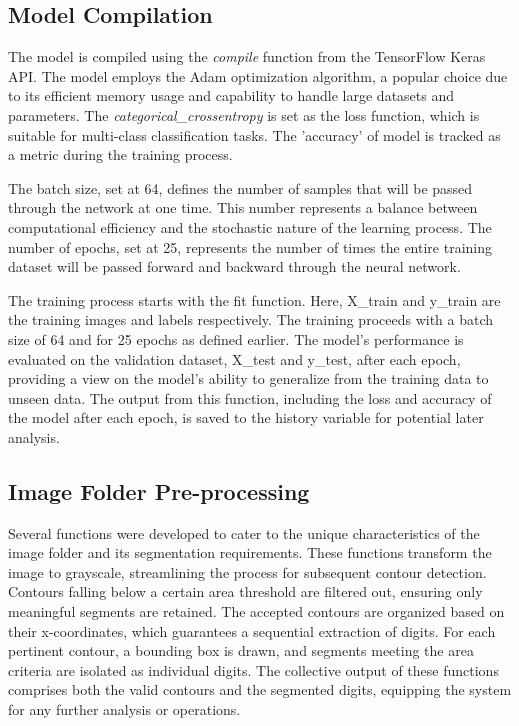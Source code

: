 \subsection{Model Compilation}
The model is compiled using the \textit{compile} function from the TensorFlow Keras API. The model employs the Adam optimization algorithm, a popular choice due to its efficient memory usage and capability to handle large datasets and parameters. The \textit{categorical\_crossentropy} is set as the loss function, which is suitable for multi-class classification tasks. The 'accuracy' of model is tracked as a metric during the training process.

The batch size, set at 64, defines the number of samples that will be passed through the network at one time. This number represents a balance between computational efficiency and the stochastic nature of the learning process. The number of epochs, set at 25, represents the number of times the entire training dataset will be passed forward and backward through the neural network.

The training process starts with the fit function. Here, X\_train and y\_train are the training images and labels respectively. The training proceeds with a batch size of 64 and for 25 epochs as defined earlier. The model's performance is evaluated on the validation dataset, X\_test and y\_test, after each epoch, providing a view on the model's ability to generalize from the training data to unseen data. The output from this function, including the loss and accuracy of the model after each epoch, is saved to the history variable for potential later analysis.

\subsection{Image Folder Pre-processing}

Several functions were developed to cater to the unique characteristics of the image folder and its segmentation requirements. These functions transform the image to grayscale, streamlining the process for subsequent contour detection. Contours falling below a certain area threshold are filtered out, ensuring only meaningful segments are retained. The accepted contours are organized based on their x-coordinates, which guarantees a sequential extraction of digits. For each pertinent contour, a bounding box is drawn, and segments meeting the area criteria are isolated as individual digits. The collective output of these functions comprises both the valid contours and the segmented digits, equipping the system for any further analysis or operations.


